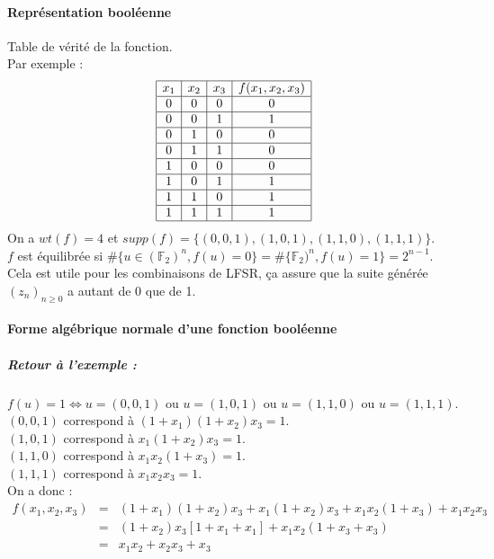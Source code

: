 \documentclass[12pt,a4paper]{report}
\begin{document}
\paragraph{Représentation booléenne}
Table de vérité de la fonction.\\
Par exemple :
$$ \begin{array}{|c|c|c|c|}\hline
x_1 & x_2 & x_3 & f(x_1,x_2,x_3) \\\hline
0 & 0 & 0 & 0 \\\hline
0 & 0 & 1 & 1 \\\hline
0 & 1 & 0 & 0 \\\hline
0 & 1 & 1 & 0 \\\hline
1 & 0 & 0 & 0 \\\hline
1 & 0 & 1 & 1 \\\hline
1 & 1 & 0 & 1 \\\hline
1 & 1 & 1 & 1 \\\hline
\end{array} $$
On a $wt(f) = 4$ et $supp(f) = \{(0,0,1),(1,0,1),(1,1,0),(1,1,1)\}$.\\

$f$ est équilibrée si $\#\{u \in (\mathbb{F}_2)^n, f(u)=0\} = \#\{\mathbb{F}_2)^n, f(u)=1\} = 2^{n-1} $. Cela est utile pour les combinaisons de LFSR, ça assure que la suite générée $(z_n)_{n\geqslant 0}$ a autant de 0 que de 1.
\paragraph{Forme algébrique normale d'une fonction booléenne}
\subparagraph{Retour à l'exemple :\\}
$f(u) = 1 \Leftrightarrow  u =(0,0,1)$ ou $ u=(1,0,1)$ ou $u=(1,1,0)$ ou $u=(1,1,1)$.\\
$(0,0,1)$ correspond à $(1+x_1)(1+x_2)x_3 = 1$.\\
$(1,0,1)$ correspond à $x_1(1+x_2)x_3 = 1$.\\
$(1,1,0)$ correspond à $x_1x_2(1+x_3) = 1$.\\
$(1,1,1)$ correspond à $x_1x_2x_3 = 1$.\\

On a donc :
\begin{eqnarray*}
 f(x_1,x_2,x_3) &=& (1+x_1)(1+x_2)x_3 + x_1(1+x_2)x_3 + x_1x_2(1+x_3) + x_1x_2x_3 \\
                &=& (1+x_2)x_3[1+x_1+x_1]+x_1x_2(1+x_3+x_3)\\
                &=& x_1x_2+x_2x_3+x_3
\end{eqnarray*}
\end{document}
